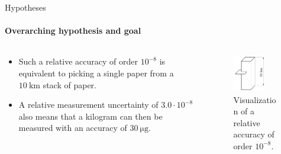\documentclass{beamer}
\begin{document}
\begin{frame}[allowframebreaks]{Hypotheses}
  \framesubtitle{Overarching hypothesis and goal}

  \begin{columns}
    \begin{column}{0.59\textwidth}
    \begin{itemize}
        \item Such a relative accuracy of order $10^{-8}$ is equivalent to picking a single paper from a $\SI{10}{\kilo\meter}$ stack of paper.
        \item A relative measurement uncertainty of $3.0\cdot 10^{-8}$ also means that a kilogram can then be measured with an accuracy of $\SI{30}{\micro\gram}$.
    \end{itemize}
    \end{column}
    
    \begin{column}{0.4\textwidth}
      \begin{figure}[h!] 
	\centering
	\includegraphics[width=0.7\textwidth]{figures/stackofpaper.pdf}
	\caption{Visualization of a relative accuracy of order $10^{-8}$.}
	\label{fig:stackofpaper}
      \end{figure}
    \end{column}
  \end{columns}
\end{frame}
\end{document}
